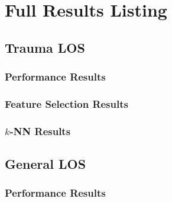 \chapter{Full Results Listing} \label{app:results}

\section{Trauma LOS}
\subsection{Performance Results}

















\clearpage
\subsection{Feature Selection Results}
\label{app:features-tr}









\clearpage
\subsection{$k$-NN Results}





\clearpage
\section{General LOS}
\subsection{Performance Results}

